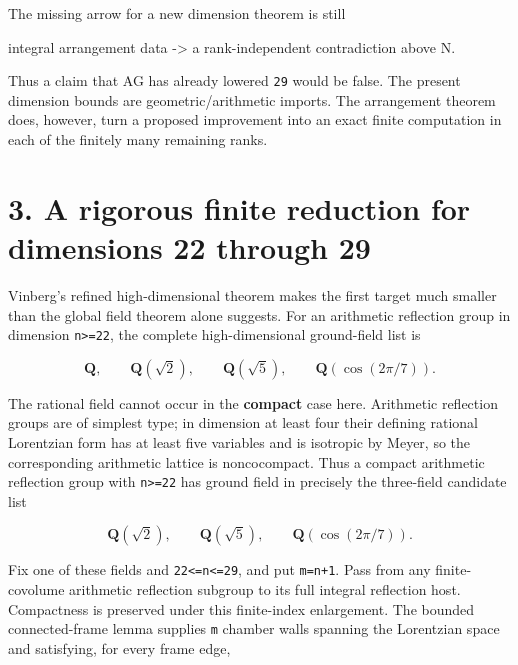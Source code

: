 \documentclass[
  10pt,
]{report}
\newenvironment{Shaded}{}{}
\newcommand{\NormalTok}[1]{#1}
\begin{document}
The missing arrow for a new dimension theorem is still

\begin{Shaded}
\begin{Highlighting}[]
\NormalTok{integral arrangement data {-}\textgreater{} a rank{-}independent contradiction above N.}
\end{Highlighting}
\end{Shaded}

Thus a claim that AG has already lowered \texttt{29} would be false. The
present dimension bounds are geometric/arithmetic imports. The
arrangement theorem does, however, turn a proposed improvement into an
exact finite computation in each of the finitely many remaining ranks.

\section{3. A rigorous finite reduction for dimensions 22 through
29}\label{a-rigorous-finite-reduction-for-dimensions-22-through-29}

Vinberg's refined high-dimensional theorem makes the first target much
smaller than the global field theorem alone suggests. For an arithmetic
reflection group in dimension \texttt{n\textgreater{}=22}, the complete
high-dimensional ground-field list is

\[
 \mathbf Q,\qquad \mathbf Q(\sqrt2),\qquad
 \mathbf Q(\sqrt5),\qquad \mathbf Q(\cos(2\pi/7)).       \tag{3.1}
\]

The rational field cannot occur in the \textbf{compact} case here.
Arithmetic reflection groups are of simplest type; in dimension at least
four their defining rational Lorentzian form has at least five variables
and is isotropic by Meyer, so the corresponding arithmetic lattice is
noncocompact. Thus a compact arithmetic reflection group with
\texttt{n\textgreater{}=22} has ground field in precisely the
three-field candidate list

\[
 \mathbf Q(\sqrt2),\qquad
 \mathbf Q(\sqrt5),\qquad
 \mathbf Q(\cos(2\pi/7)).                              \tag{3.2}
\]

Fix one of these fields and \texttt{22\textless{}=n\textless{}=29}, and
put \texttt{m=n+1}. Pass from any finite-covolume arithmetic reflection
subgroup to its full integral reflection host. Compactness is preserved
under this finite-index enlargement. The bounded connected-frame lemma
supplies \texttt{m} chamber walls spanning the Lorentzian space and
satisfying, for every frame edge,
\end{document}
